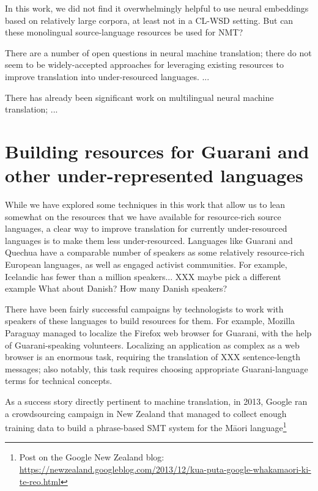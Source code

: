 In this work, we did not find it overwhelmingly helpful to use neural
embeddings based on relatively large corpora, at least not in a CL-WSD setting.
But can these monolingual source-language resources be used for NMT?

There are a number of open questions in neural machine translation; there do
not seem to be widely-accepted approaches for leveraging existing resources to
improve translation into under-resourced languages. ... %

There has already been significant work on multilingual neural machine
translation; ...



\section{Building resources for Guarani and other under-represented languages}
\label{sec:crowdsourcing}

While we have explored some techniques in this work that allow us to lean
somewhat on the resources that we have available for resource-rich source
languages, a clear way to improve translation for currently under-resourced
languages is to make them less under-resourced. Languages like Guarani and
Quechua have a comparable number of speakers as some relatively resource-rich
European languages, as well as engaged activist communities. For example,
Icelandic has fewer than a million speakers... XXX maybe pick a different
example
What about Danish? How many Danish speakers?

There have been fairly successful campaigns by technologists to work with
speakers of these languages to build resources for them.
For example, Mozilla Paraguay managed to localize the Firefox web browser for
Guarani, with the help of Guarani-speaking volunteers. Localizing an
application as complex as a web browser is an enormous task, requiring the
translation of XXX sentence-length messages; also notably, this task requires
choosing appropriate Guarani-language terms for technical concepts.

As a success story directly pertinent to machine translation, in 2013, Google
ran a crowdsourcing campaign in New Zealand that managed to collect
enough training data to build a phrase-based SMT system for the Māori
language\footnote{Post on the Google New Zealand blog:
\url{https://newzealand.googleblog.com/2013/12/kua-puta-google-whakamaori-ki-te-reo.html}}

